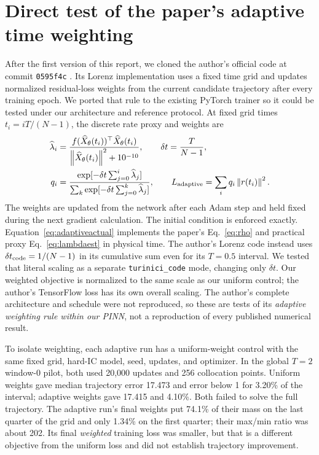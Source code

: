 \documentclass[11pt,a4paper]{article}
\newcommand{\norm}[1]{\left\lVert #1\right\rVert}
\begin{document}
\section{Direct test of the paper's adaptive time weighting}\label{sec:adaptive}
After the first version of this report, we cloned the author's official code at commit \texttt{0595f4c} \cite{authorcode}. Its Lorenz implementation uses a fixed time grid and updates normalized residual-loss weights from the current candidate trajectory after every training epoch. We ported that rule to the existing PyTorch trainer so it could be tested under our architecture and reference protocol. At fixed grid times $t_i=iT/(N-1)$, the discrete rate proxy and weights are
\begin{align}\label{eq:adaptiveactual}
\widehat\lambda_i&=\frac{f(\widehat X_\theta(t_i))^\top\widehat X_\theta(t_i)}
{\norm{\widehat X_\theta(t_i)}^2+10^{-10}},\qquad \delta t=\frac{T}{N-1},\\
q_i&=\frac{\exp[-\delta t\sum_{j=0}^i\widehat\lambda_j]}
{\sum_k\exp[-\delta t\sum_{j=0}^k\widehat\lambda_j]},\qquad
L_{\rm adaptive}=\sum_i q_i\norm{r(t_i)}^2.
\end{align}
The weights are updated from the network after each Adam step and held fixed during the next gradient calculation. The initial condition is enforced exactly. Equation~\eqref{eq:adaptiveactual} implements the paper's Eq.~\eqref{eq:rho} and practical proxy Eq.~\eqref{eq:lambdaest} in physical time. The author's Lorenz code instead uses $\delta t_{\rm code}=1/(N-1)$ in its cumulative sum even for its $T=0.5$ interval. We tested that literal scaling as a separate \texttt{turinici\_code} mode, changing only $\delta t$. Our weighted objective is normalized to the same scale as our uniform control; the author's TensorFlow loss has its own overall scaling. The author's complete architecture and schedule were not reproduced, so these are tests of its \emph{adaptive weighting rule within our PINN}, not a reproduction of every published numerical result.

To isolate weighting, each adaptive run has a uniform-weight control with the same fixed grid, hard-IC model, seed, updates, and optimizer. In the global $T=2$ window-0 pilot, both used 20,000 updates and 256 collocation points. Uniform weights gave median trajectory error 17.473 and error below 1 for 3.20\% of the interval; adaptive weights gave 17.415 and 4.10\%. Both failed to solve the full trajectory. The adaptive run's final weights put 74.1\% of their mass on the last quarter of the grid and only 1.34\% on the first quarter; their max/min ratio was about 202. Its final \emph{weighted} training loss was smaller, but that is a different objective from the uniform loss and did not establish trajectory improvement.
\end{document}

